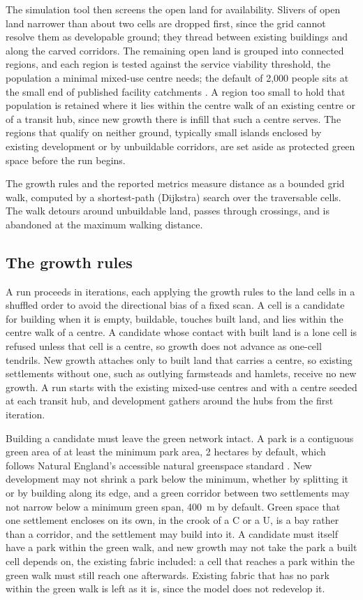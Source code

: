\documentclass[11pt]{article}
\begin{document}
The simulation tool then screens the open land for availability. Slivers of open land narrower than about two cells are dropped first, since the grid cannot resolve them as developable ground; they thread between existing buildings and along the carved corridors. The remaining open land is grouped into connected regions, and each region is tested against the service viability threshold, the population a minimal mixed-use centre needs; the default of 2{,}000 people sits at the small end of published facility catchments \citep{barton2021}. A region too small to hold that population is retained where it lies within the centre walk of an existing centre or of a transit hub, since new growth there is infill that such a centre serves. The regions that qualify on neither ground, typically small islands enclosed by existing development or by unbuildable corridors, are set aside as protected green space before the run begins.

The growth rules and the reported metrics measure distance as a bounded grid walk, computed by a shortest-path (Dijkstra) search over the traversable cells. The walk detours around unbuildable land, passes through crossings, and is abandoned at the maximum walking distance.

\subsection{The growth rules}
\label{sec:growth}

A run proceeds in iterations, each applying the growth rules to
the land cells in a shuffled order to avoid the directional bias
of a fixed scan. A cell is a candidate
for building when it is empty, buildable, touches built land, and
lies within the centre walk of a centre. A candidate whose contact
with built land is a lone cell is refused unless that cell is a
centre, so growth does not advance as one-cell tendrils.
New growth attaches only to built land that carries a centre, so
existing settlements without one, such as outlying farmsteads and
hamlets, receive no new growth. A run starts with the existing mixed-use
centres and with a centre seeded at each transit hub, and development
gathers around the hubs from the first iteration.

Building a candidate must leave the green network intact. A park is
a contiguous green area of at least the minimum park area, 2
hectares by default, which follows Natural England's accessible
natural greenspace standard \citep{naturalengland2010}. New
development may not shrink a park below the minimum, whether by
splitting it or by building along its edge, and a green corridor
between two settlements may not narrow below a minimum green span,
400~m by default. Green space
that one settlement encloses on its own, in the crook of a C or a U,
is a bay rather than a corridor, and the settlement may build into
it. A candidate must itself have a park within the green walk, and
new growth may not take the park a built cell depends on, the
existing fabric included: a cell that reaches a park within the green
walk must still reach one afterwards. Existing fabric that has no park
within the green walk is left as it is, since the model does not
redevelop it.
\end{document}
